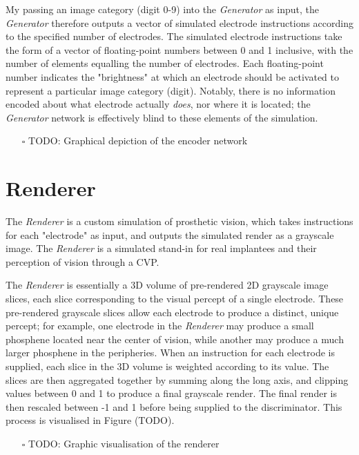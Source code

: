 \documentclass[a4paper,11pt,openany]{book}
\begin{document}
My passing an image category (digit 0-9) into the \emph{Generator} as input, the \emph{Generator} therefore outputs a vector of simulated electrode instructions according to the specified number of electrodes.
The simulated electrode instructions take the form of a vector of floating-point numbers between 0 and 1 inclusive, with the number of elements equalling the number of electrodes.
Each floating-point number indicates the "brightness" at which an electrode should be activated to represent a particular image category (digit).
Notably, there is no information encoded about what electrode actually \emph{does}, nor where it is located; the \emph{Generator} network is effectively blind to these elements of the simulation.

\begin{enumerate}
\item[{$\square$}] TODO: Graphical depiction of the encoder network
\end{enumerate}

\section*{Renderer}
\label{sec:org704c5ae}

The \emph{Renderer} is a custom simulation of prosthetic vision, which takes instructions for each "electrode" as input, and outputs the simulated render as a grayscale image.
The \emph{Renderer} is a simulated stand-in for real implantees and their perception of vision through a CVP.

The \emph{Renderer} is essentially a 3D volume of pre-rendered 2D grayscale image slices, each slice corresponding to the visual percept of a single electrode.
These pre-rendered grayscale slices allow each electrode to produce a distinct, unique percept; for example, one electrode in the \emph{Renderer} may produce a small phosphene located near the center of vision, while another may produce a much larger phosphene in the peripheries.
When an instruction for each electrode is supplied, each slice in the 3D volume is weighted according to its value.
The slices are then aggregated together by summing along the long axis, and clipping values between 0 and 1 to produce a final grayscale render.
The final render is then rescaled between -1 and 1 before being supplied to the discriminator.
This process is visualised in Figure (TODO).

\begin{itemize}
\item[{$\square$}] TODO: Graphic visualisation of the renderer
\end{itemize}
\end{document}
